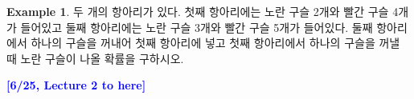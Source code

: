 \documentclass{article}
\theoremstyle{definition}
\newtheorem{example}[theorem]{Example}
\begin{document}
\begin{example}
    두 개의 항아리가 있다. 첫째 항아리에는 노란 구슬 2개와 빨간 구슬 4개가 들어있고 둘째 항아리에는 노란 구슬 3개와 빨간 구슬 5개가 들어있다. 둘째 항아리에서 하나의 구슬을 꺼내어 첫째 항아리에 넣고 첫째 항아리에서 하나의 구슬을 꺼낼 때 노란 구슬이 나올 확률을 구하시오.
\end{example}


\noindent
\textcolor{blue}{\textbf{[6/25, Lecture 2 to here]}}
\end{document}
